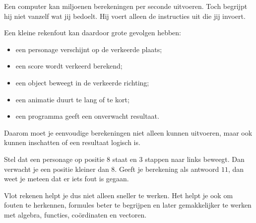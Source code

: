 \documentclass{ximera}
\begin{document}



Een computer kan miljoenen berekeningen per seconde uitvoeren.
Toch begrijpt hij niet vanzelf wat jij bedoelt. Hij voert alleen de
instructies uit die jij invoert.

Een kleine rekenfout kan daardoor grote gevolgen hebben:

\begin{itemize}
  \item een personage verschijnt op de verkeerde plaats;
  \item een score wordt verkeerd berekend;
  \item een object beweegt in de verkeerde richting;
  \item een animatie duurt te lang of te kort;
  \item een programma geeft een onverwacht resultaat.
\end{itemize}

Daarom moet je eenvoudige berekeningen niet alleen kunnen uitvoeren,
maar ook kunnen inschatten of een resultaat logisch is.

\begin{voorbeeld}
    Stel dat een personage op positie \(8\) staat en \(3\) stappen naar links
beweegt. Dan verwacht je een positie kleiner dan \(8\). Geeft je berekening
als antwoord \(11\), dan weet je meteen dat er iets fout is gegaan.
\end{voorbeeld}


Vlot rekenen helpt je dus niet alleen sneller te werken. Het helpt je ook
om fouten te herkennen, formules beter te begrijpen en later gemakkelijker
te werken met algebra, functies, coördinaten en vectoren.
\end{document}
